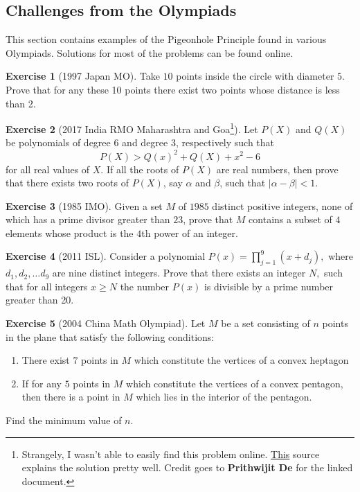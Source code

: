 \documentclass[l1pt]{article}
\theoremstyle{plain}
\theoremstyle{definition}
\newtheorem{exercise}{Exercise}[section]
\theoremstyle{remark}
\begin{document}
\subsection{Challenges from the Olympiads}

This section contains examples of the Pigeonhole Principle found in various Olympiads. Solutions for most of the problems can be found online.

\begin{exercise}[1997 Japan MO]
 Take $10$ points inside the circle with diameter $5$. Prove that for any these 10 points there exist two points whose distance is less than 2.
\end{exercise}

\begin{exercise}[2017 India RMO Maharashtra and Goa\footnote{Strangely, I wasn't able to easily find this problem online. \href{https://apfstatic.s3.ap-south-1.amazonaws.com/s3fs-public/15_Prithwijit_PigeonholePrinciple.pdf?FIhlG8dGoKVAa36UwezGHRRxuVBzLIZ0}{This} source explains the solution pretty well. Credit goes to \textbf{Prithwijit De} for the linked document.}]
 Let $P(X)$ and $Q(X)$ be polynomials of degree 6 and degree 3, respectively such that \[P(X)>Q(x)^2+Q(X)+x^2-6\] for all real values of $X$. If all the roots of $P(X)$ are real numbers, then prove that there exists two roots of $P(X)$, say $\alpha$ and $\beta$, such that $|\alpha-\beta|<1$.
\end{exercise}

\begin{exercise}[1985 IMO]
 Given a set $M$ of $1985$ distinct positive integers, none of which has a prime divisor greater than $23$, prove that $M$ contains a subset of $4$ elements whose product is the $4$th power of an integer.
\end{exercise}

\begin{exercise} [2011 ISL]
 Consider a polynomial $P(x) =  \prod^9_{j=1}(x+d_j),$ where $d_1, d_2, \ldots d_9$ are nine distinct integers. Prove that there exists an integer $N,$ such that for all integers $x \geq N$ the number $P(x)$ is divisible by a prime number greater than 20.
\end{exercise}

\begin{exercise}[2004 China Math Olympiad]
 Let $M$ be a set consisting of $n$ points in the plane that satisfy the following conditions:
 \begin{enumerate}
     \item There exist $7$ points in $M$ which constitute the vertices of a convex heptagon
     \item If for any $5$ points in $M$ which constitute the vertices of a convex pentagon, then there is a point in $M$ which lies in the interior of the pentagon.
 \end{enumerate}
Find the minimum value of $n$.
\end{exercise}
\end{document}

